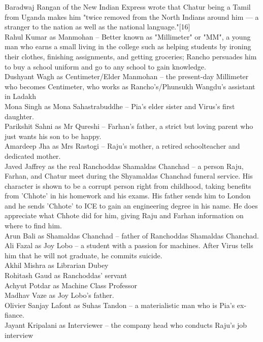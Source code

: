 \documentclass{article}
\begin{document}
Baradwaj Rangan of the New Indian Express wrote that Chatur being a Tamil from Uganda makes him "twice removed from the North Indians around him — a stranger to the nation as well as the national language."[16]\\
Rahul Kumar as Manmohan – Better known as "Millimeter" or "MM", a young man who earns a small living in the college such as helping students by ironing their clothes, finishing assignments, and getting groceries; Rancho persuades him to buy a school uniform and go to any school to gain knowledge.\\
Dushyant Wagh as Centimeter/Elder Manmohan – the present-day Millimeter who becomes Centimeter, who works as Rancho's/Phunsukh Wangdu's assistant in Ladakh\\
Mona Singh as Mona Sahastrabuddhe – Pia's elder sister and Virus's first daughter.\\
Parikshit Sahni as Mr Qureshi – Farhan's father, a strict but loving parent who just wants his son to be happy.\\
Amardeep Jha as Mrs Rastogi – Raju's mother, a retired schoolteacher and dedicated mother.\\
Javed Jaffrey as the real Ranchoddas Shamaldas Chanchad – a person Raju, Farhan, and Chatur meet during the Shyamaldas Chanchad funeral service. His character is shown to be a corrupt person right from childhood, taking benefits from 'Chhote' in his homework and his exams. His father sends him to London and he sends 'Chhote' to ICE to gain an engineering degree in his name. He does appreciate what Chhote did for him, giving Raju and Farhan information on where to find him.\\
Arun Bali as Shamaldas Chanchad – father of Ranchoddas Shamaldas Chanchad.\\
Ali Fazal as Joy Lobo – a student with a passion for machines. After Virus tells him that he will not graduate, he commits suicide.\\
Akhil Mishra as Librarian Dubey\\
Rohitash Gaud as Ranchoddas' servant\\
Achyut Potdar as Machine Class Professor\\
Madhav Vaze as Joy Lobo's father.\\
Olivier Sanjay Lafont as Suhas Tandon – a materialistic man who is Pia's ex-fiance.\\
Jayant Kripalani as Interviewer – the company head who conducts Raju's job interview\\
\end{document}
